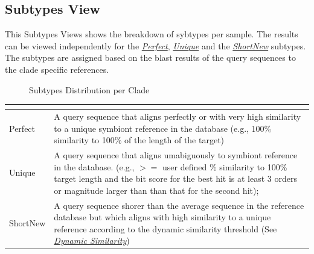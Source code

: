 \documentclass[letterpaper,10pt,english]{sphinxmanual}
\begin{document}
\subsection{Subtypes View}
\label{Web:subtypes-view}
This Subtypes Views shows the breakdown of sybtypes per sample. The results
can be viewed independently for the {\hyperref[defs:perfect]{\emph{Perfect}}}, {\hyperref[defs:unique]{\emph{Unique}}} and the
{\hyperref[defs:shortnew]{\emph{ShortNew}}} subtypes. The subtypes are assigned based on the blast results of the query sequences to
the clade specific references.
\begin{figure}[htbp]
\centering
\capstart

\caption{Subtypes Distribution per Clade}\end{figure}

\begin{tabulary}{\linewidth}{|L|L|}
\hline
\textsf{\relax } & \textsf{\relax }\\
\hline
Perfect
 & 
A query sequence that aligns perfectly or with very high similarity to a unique symbiont reference in the database (e.g., 100\% similarity to 100\% of the length of the target)
\\

Unique
 & 
A query sequence that aligns umabiguously to symbiont reference in the database. (e.g., \(>=\) user defined \%
similarity to 100\% target length and the bit score for the best hit is at least 3 orders or magnitude larger than than that for the second hit);
\\

ShortNew
 & 
A query sequence shorer than the average sequence in the reference database
but which aligns with high similarity to a unique reference according to the dynamic similarity threshold (See {\hyperref[defs:dynamic-similarity]{\emph{Dynamic Similarity}}})
\\
\hline\end{tabulary}
\end{document}
